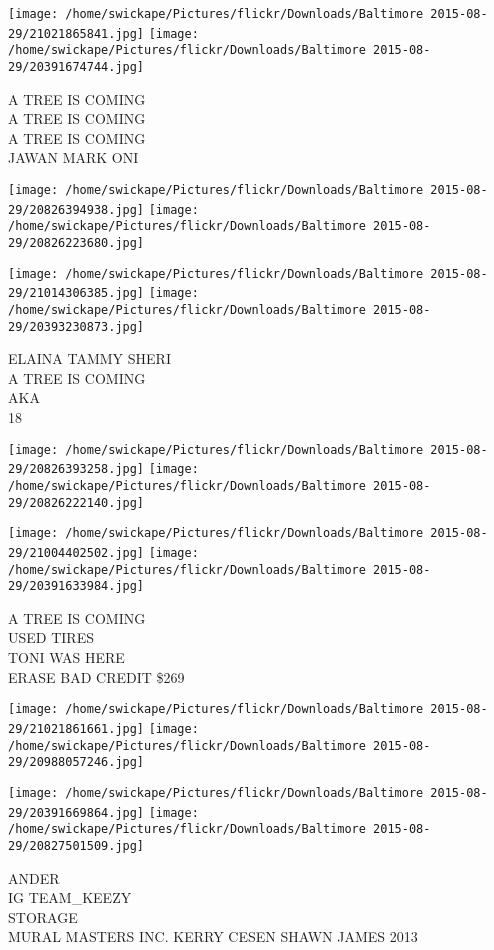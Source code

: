 \documentclass[10pt,letterpaper]{article}
\begin{document}
\texttt{[image: /home/swickape/Pictures/flickr/Downloads/Baltimore 2015-08-29/21021865841.jpg]}
\texttt{[image: /home/swickape/Pictures/flickr/Downloads/Baltimore 2015-08-29/20391674744.jpg]}

A TREE IS COMING\\
A TREE IS COMING\\
A TREE IS COMING\\
JAWAN MARK ONI
\pagebreak

\texttt{[image: /home/swickape/Pictures/flickr/Downloads/Baltimore 2015-08-29/20826394938.jpg]}
\texttt{[image: /home/swickape/Pictures/flickr/Downloads/Baltimore 2015-08-29/20826223680.jpg]}

\texttt{[image: /home/swickape/Pictures/flickr/Downloads/Baltimore 2015-08-29/21014306385.jpg]}
\texttt{[image: /home/swickape/Pictures/flickr/Downloads/Baltimore 2015-08-29/20393230873.jpg]}

ELAINA TAMMY SHERI\\
A TREE IS COMING\\
AKA\\
18
\pagebreak

\texttt{[image: /home/swickape/Pictures/flickr/Downloads/Baltimore 2015-08-29/20826393258.jpg]}
\texttt{[image: /home/swickape/Pictures/flickr/Downloads/Baltimore 2015-08-29/20826222140.jpg]}

\texttt{[image: /home/swickape/Pictures/flickr/Downloads/Baltimore 2015-08-29/21004402502.jpg]}
\texttt{[image: /home/swickape/Pictures/flickr/Downloads/Baltimore 2015-08-29/20391633984.jpg]}

A TREE IS COMING\\
USED TIRES\\
TONI WAS HERE\\
ERASE BAD CREDIT \$269
\pagebreak

\texttt{[image: /home/swickape/Pictures/flickr/Downloads/Baltimore 2015-08-29/21021861661.jpg]}
\texttt{[image: /home/swickape/Pictures/flickr/Downloads/Baltimore 2015-08-29/20988057246.jpg]}

\texttt{[image: /home/swickape/Pictures/flickr/Downloads/Baltimore 2015-08-29/20391669864.jpg]}
\texttt{[image: /home/swickape/Pictures/flickr/Downloads/Baltimore 2015-08-29/20827501509.jpg]}

ANDER\\
IG TEAM\_KEEZY\\
STORAGE\\
MURAL MASTERS INC. KERRY CESEN SHAWN JAMES 2013
\pagebreak
\end{document}
